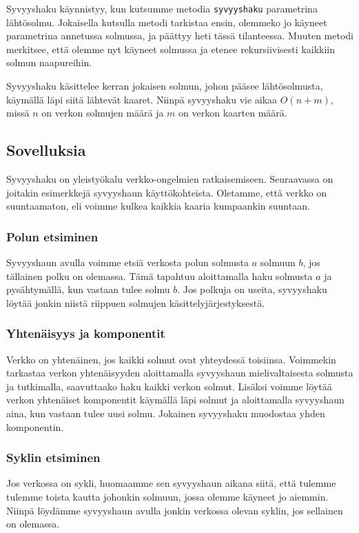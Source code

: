 Syvyyshaku käynnistyy, kun kutsumme metodia
\texttt{syvyyshaku} parametrina lähtösolmu.
Jokaisella kutsulla metodi tarkistaa ensin,
olemmeko jo käyneet parametrina annetussa solmussa,
ja päättyy heti tässä tilanteessa.
Muuten metodi merkitsee, että olemme nyt käyneet solmussa
ja etenee rekursiivisesti kaikkiin solmun naapureihin.

Syvyyshaku käsittelee kerran jokaisen solmun,
johon pääsee lähtösolmusta,
käymällä läpi siitä lähtevät kaaret.
Niinpä syvyyshaku vie aikaa $O(n+m)$, missä $n$ on
verkon solmujen määrä ja $m$ on verkon kaarten määrä.

\subsection{Sovelluksia}

Syvyyshaku on yleistyökalu verkko-ongelmien ratkaisemiseen.
Seuraavassa on joitakin esimerkkejä syvyyshaun käyttökohteista.
Oletamme, että verkko on suuntaamaton, eli voimme kulkea
kaikkia kaaria kumpaankin suuntaan.

\subsubsection{Polun etsiminen}

Syvyyshaun avulla voimme etsiä verkosta polun solmusta
$a$ solmuun $b$, jos tällainen polku on olemassa.
Tämä tapahtuu aloittamalla haku solmusta $a$
ja pysähtymällä, kun vastaan tulee solmu $b$.
Jos polkuja on useita, syvyyshaku löytää jonkin niistä
riippuen solmujen käsittelyjärjestyksestä.

\subsubsection{Yhtenäisyys ja komponentit}

Verkko on yhtenäinen, jos kaikki solmut ovat yhteydessä
toisiinsa.
Voimmekin tarkastaa verkon yhtenäisyyden aloittamalla
syvyyshaun mielivaltaisesta solmusta ja tutkimalla,
saavuttaako haku kaikki verkon solmut.
Lisäksi voimme löytää verkon yhtenäiset komponentit
käymällä läpi solmut ja aloittamalla syvyyshaun aina,
kun vastaan tulee uusi solmu.
Jokainen syvyyshaku muodostaa yhden komponentin.

\subsubsection{Syklin etsiminen}

Jos verkossa on sykli, huomaamme sen syvyyshaun aikana siitä,
että tulemme tulemme toista kautta johonkin solmuun,
jossa olemme käyneet jo aiemmin.
Niinpä löydämme syvyyshaun avulla jonkin verkossa olevan
syklin, jos sellainen on olemassa.

